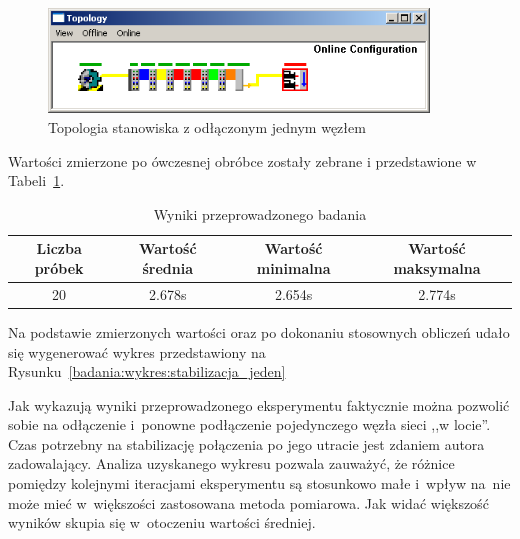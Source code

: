 \begin{figure}[!htb] 	\centering 	\includegraphics[width=0.9\textwidth]{images/topologyCXerror} \caption{Topologia stanowiska z odłączonym jednym węzłem} \label{one_slave} \end{figure}

Wartości zmierzone po ówczesnej obróbce zostały zebrane i przedstawione w Tabeli~\ref{badania:wyniki:stabilizacja_jeden}.
\begin{table}[!htb]
\begin{center}
\begin{tabular}{| c | c | c | c |}\hline
\textbf{Liczba próbek} & \textbf{Wartość średnia} & \textbf{Wartość minimalna} & \textbf{Wartość maksymalna} \\\hline\hline
20 & 2.678s & 2.654s & 2.774s \\\hline
\end{tabular}
\end{center}
\vspace*{-6mm}
  \caption{Wyniki przeprowadzonego badania}
	\label{badania:wyniki:stabilizacja_jeden}
\end{table}
Na podstawie zmierzonych wartości oraz po dokonaniu stosownych obliczeń udało się wygenerować wykres przedstawiony na Rysunku~\ref{badania:wykres:stabilizacja_jeden}


Jak wykazują wyniki przeprowadzonego eksperymentu faktycznie można pozwolić sobie na odłączenie i~ponowne podłączenie pojedynczego węzła sieci ,,w locie''. Czas potrzebny na stabilizację połączenia po jego utracie jest zdaniem autora zadowalający. Analiza uzyskanego wykresu pozwala zauważyć, że różnice pomiędzy kolejnymi iteracjami eksperymentu są stosunkowo małe i~wpływ na~nie może mieć w~większości zastosowana metoda pomiarowa. Jak widać większość wyników skupia się w~otoczeniu wartości średniej.

